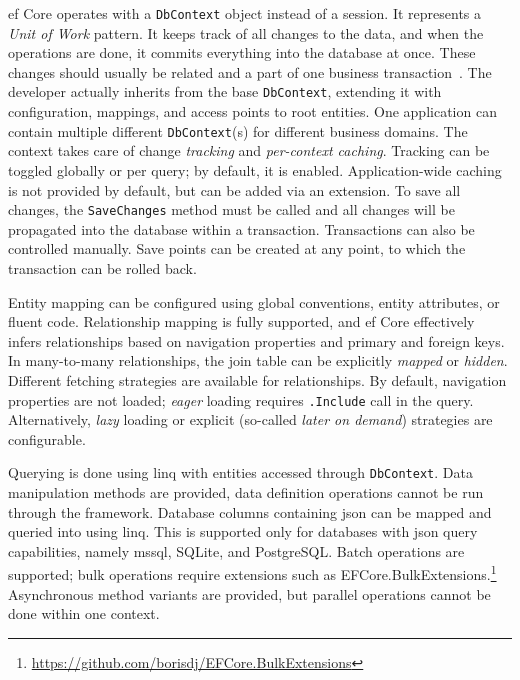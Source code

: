 \acrshort{ef} Core operates with a \texttt{DbContext} object instead of a session. It represents a \textit{Unit of Work} pattern. It keeps track of all changes to the data, and when the operations are done, it commits everything into the database at once. These changes should usually be related and a part of one business transaction~\cite{FowlerUOW}. The developer actually inherits from the base \texttt{DbContext}, extending it with configuration, mappings, and access points to root entities. One application can contain multiple different \texttt{DbContext}(s) for different business domains. The context takes care of change \textit{tracking} and \textit{per-context caching}. Tracking can be toggled globally or per query; by default, it is enabled. Application-wide caching is not provided by default, but can be added via an extension. To save all changes, the \texttt{SaveChanges} method must be called and all changes will be propagated into the database within a transaction. Transactions can also be controlled manually. Save points can be created at any point, to which the transaction can be rolled back.

Entity mapping can be configured using global conventions, entity attributes, or fluent code. Relationship mapping is fully supported, and \acrshort{ef} Core effectively infers relationships based on navigation properties and primary and foreign keys. In many-to-many relationships, the join table can be explicitly \textit{mapped} or \textit{hidden}. Different fetching strategies are available for relationships. By default, navigation properties are not loaded; \textit{eager} loading requires \texttt{.Include} call in the query. Alternatively, \textit{lazy} loading or explicit (so-called \textit{later on demand}) strategies are configurable. 

Querying is done using \acrshort{linq} with entities accessed through \texttt{DbContext}. Data manipulation methods are provided, data definition operations cannot be run through the framework. Database columns containing \acrshort{json} can be mapped and queried into using \acrshort{linq}. This is supported only for databases with \acrshort{json} query capabilities, namely \acrshort{mssql}, SQLite, and PostgreSQL. Batch operations are supported; bulk operations require extensions such as EFCore.BulkExtensions.\footnote{\url{https://github.com/borisdj/EFCore.BulkExtensions}} Asynchronous method variants are provided, but parallel operations cannot be done within one context.

